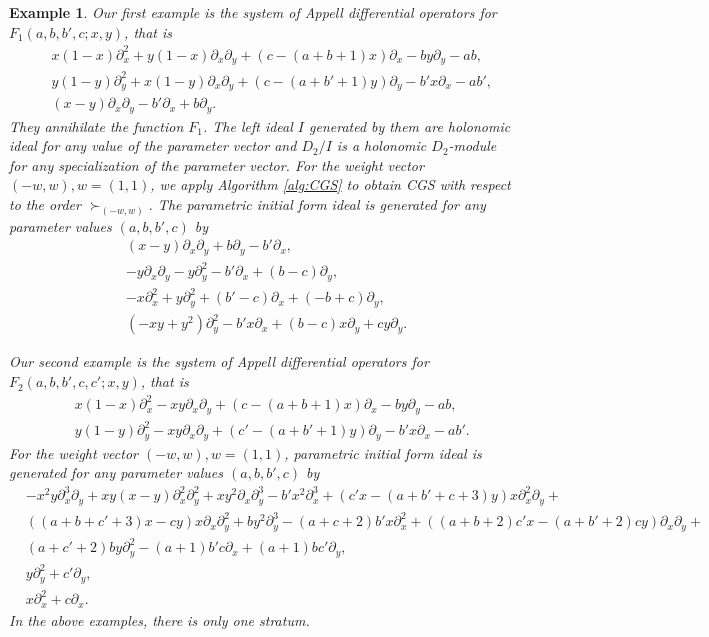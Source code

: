 \documentclass{article}
\def\aa{a}
\def\bb{b}
\def\cc{c}
\def\pd#1{\partial_{#1}}
\newtheorem{example}{Example}
\begin{document}
\begin{example} \rm  \label{ex:f1-f2-w-w-gb}
Our first example is
the system of Appell differential operators for $F_1(a,b,b',c;x,y)$,
that is
\begin{eqnarray}
&&x(1-x)\pd{x}^2+y(1-x)\pd{x}\pd{y}+(\cc-(\aa+\bb+1)x)\pd{x}-\bb y \pd{y} - \aa \bb,  \label{eq:f1a}\\
&&y(1-y)\pd{y}^2+x(1-y)\pd{x}\pd{y}+(\cc-(\aa+\bb'+1)y)\pd{y}-\bb' x \pd{x} - \aa \bb',  \label{eq:f1b} \\
&&(x-y) \pd{x}\pd{y} - \bb' \pd{x} + \bb \pd{y}. \label{eq:f1c}
\end{eqnarray}
They annihilate the function $F_1$.
The left ideal $I$ generated by them are holonomic ideal for any value
of the parameter vector and $D_2/I$ is a holonomic $D_2$-module for any specialization of the parameter vector.
For the weight vector $(-w,w), w = (1,1)$,
we apply Algorithm \ref{alg:CGS} to obtain CGS with respect to 
the order $\succ_{(-w,w)}$.
The parametric initial form ideal
is generated for any parameter values $(a,b,b',c)$
by 
\begin{align*}
&(x-y) \pd{x} \pd{y} + b \pd{y} - b' \pd{x}, \\
&-y \pd{x}\pd{y} - y \pd{y}^2 - b' \pd{x} +(b-c) \pd{y}, \\
&-x \pd{x}^2 + y \pd{y}^2 +(b'-c) \pd{x} + (-b+c) \pd{y}, \\
& (-xy+y^2)\pd{y}^2 - b' x \pd{x} + (b-c)x\pd{y} + cy \pd{y}.   
\end{align*}

Our second example is
the system of Appell differential operators for
$F_2(a,b,b',c,c';x,y)$, that is
\begin{eqnarray}
&&x(1-x)\pd{x}^2-xy\pd{x}\pd{y}+(\cc-(\aa+\bb+1)x)\pd{x}-\bb y \pd{y}-\aa \bb, \label{eq:f2a} \\
&&y(1-y)\pd{y}^2-xy\pd{x}\pd{y}+(\cc'-(\aa+\bb'+1)y)\pd{y}-\bb' x \pd{x}-\aa \bb'. \label{eq:f2b}
\end{eqnarray}
For the weight vector $(-w,w), w = (1,1)$,
parametric initial form ideal
is generated for any parameter values $(a,b,b',c)$
by 
\begin{align*}
& -x^2 y \pd{x}^3 \pd{y} + xy(x-y) \pd{x}^2 \pd{y}^2 + x y^2 \pd{x}\pd{y}^3 
-b' x^2 \pd{x}^3 + (c'x - (a+b'+c+3)y) x \pd{x}^2 \pd{y} + \\
& ((a+b+c'+3)x - cy)x\pd{x} \pd{y}^2
+ b y^2 \pd{y}^3 - (a + c + 2) b' x \pd{x}^2 + ((a+b+2)c'x-(a+b'+2)cy)\pd{x}\pd{y} + \\
& (a+c'+2)by \pd{y}^2 - (a+1)b'c \pd{x} + (a+1)bc' \pd{y}, \\
&y \pd{y}^2 + c' \pd{y}, \\
&x \pd{x}^2 + c \pd{x}. 
\end{align*}
In the above examples, there is only one stratum.


\end{example}
\end{document}
